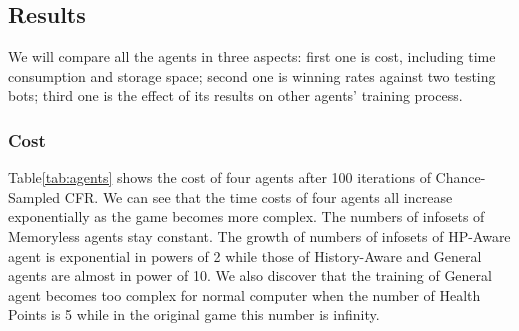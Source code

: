 \documentclass[runningheads]{llncs}
\begin{document}
\subsection{Results}
    We will compare all the agents in three aspects: first one is cost, including time consumption and storage space; second one is winning rates against two testing bots; third one is the effect of its results on other agents' training process.
    
    \subsubsection{Cost}
    Table\ref{tab:agents} shows the cost of four agents after 100 iterations of Chance-Sampled CFR. We can see that the time costs of four agents all increase exponentially as the game becomes more complex. The numbers of infosets of Memoryless agents stay constant. The growth of numbers of infosets of HP-Aware agent is exponential in powers of 2 while those of History-Aware and General agents are almost in power of 10. We also discover that the training of General agent becomes too complex for normal computer when the number of Health Points is 5 while in the original game this number is infinity.
    
    \begin{table}[htbp]
        \centering
    \end{table}
\end{document}
